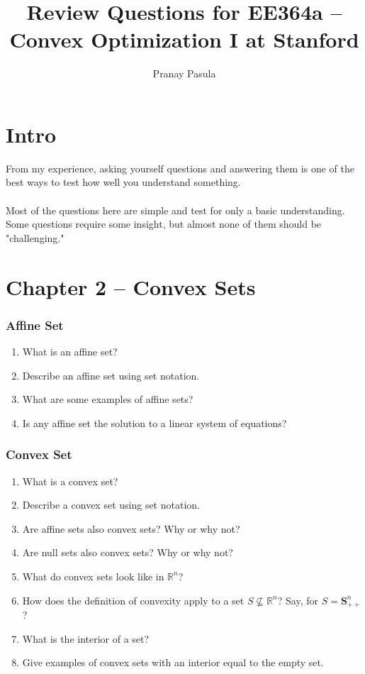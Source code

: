 \documentclass[]{article}
\title{Review Questions for EE364a -- Convex Optimization I at Stanford}
\author{Pranay Pasula}
\newcommand{\Rn}{\mathbb{R}^{n}}
\newcommand{\Snpp}{\boldsymbol{S}^{n}_{++}}
\newcounter{q}
\begin{document}
\maketitle

\section*{Intro}
From my experience, asking yourself questions and answering them is one of the best ways to test how well you understand something. 
\\\\
Most of the questions here are simple and test for only a basic understanding. Some questions require some insight, but almost none of them should be "challenging."
\\
\section*{Chapter 2 -- Convex Sets}

\subsubsection*{Affine Set}

\begin{enumerate}
 \item What is an affine set?
 \item Describe an affine set using set notation.
 \item What are some examples of affine sets?
 \item Is any affine set the solution to a linear system of equations?
\end{enumerate}

\subsubsection*{Convex Set}

\begin{enumerate}[resume*]
\item What is a convex set? 
\item Describe a convex set using set notation. 
\item Are affine sets also convex sets? Why or why not? 
\item Are null sets also convex sets? Why or why not? 
\item What do convex sets look like in $\Rn$? 
\item How does the definition of convexity apply to a set $S \nsubseteq \Rn$? Say, for $S = \Snpp$? 
\item What is the interior of a set? 
\item Give examples of convex sets with an interior equal to the empty set.
\end{enumerate}
\end{document}
